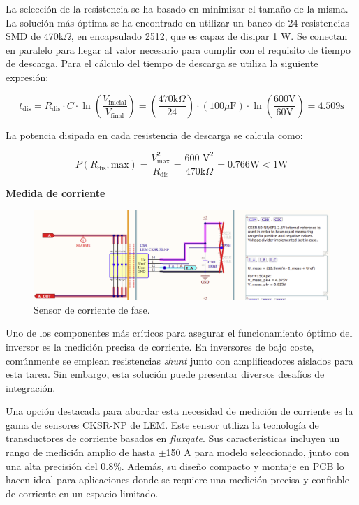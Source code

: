 La selección de la resistencia se ha basado en minimizar el tamaño de la misma. La solución más óptima se ha encontrado en utilizar un banco de 24 resistencias SMD de 470k$\Omega$, en encapsulado 2512, que es capaz de disipar 1 W. Se conectan en paralelo para llegar al valor necesario para cumplir con el requisito de tiempo de descarga. Para el cálculo del tiempo de descarga se utiliza la siguiente expresión:

\[
t_{\text{dis}} = R_{\text{dis}} \cdot C \cdot \ln\left(\frac{V_{\text{inicial}}}{V_{\text{final}}}\right) = \left(\frac{470 \text{k}\Omega}{24}\right) \cdot (100 \mu\text{F}) \cdot \ln\left(\frac{600 \text{V}}{60 \text{V}}\right) = 4.509 \text{s}
\]

La potencia disipada en cada resistencia de descarga se calcula como:

\[
P(R_{\text{dis}}, \text{max}) = \frac{V_{\text{max}}^2}{R_{\text{dis}}} = \frac{600\text{ V}^2}{470 \text{k}\Omega} = 0.766 \text{W} < 1 \text{W}
\]

\textbf{Medida de corriente}

\begin{figure}[H]
	\centering
	\includegraphics[width=0.8\linewidth]{fig/Imeas-sch}
	\caption{Sensor de corriente de fase.}
\end{figure}

Uno de los componentes más críticos para asegurar el funcionamiento óptimo del inversor es la medición precisa de corriente. En inversores de bajo coste, comúnmente se emplean resistencias \textit{shunt} junto con amplificadores aislados para esta tarea. Sin embargo, esta solución puede presentar diversos desafíos de integración.

Una opción destacada para abordar esta necesidad de medición de corriente es la gama de sensores CKSR-NP de LEM. Este sensor utiliza la tecnología de transductores de corriente basados en \textit{fluxgate}. Sus características incluyen un rango de medición amplio de hasta $\pm$150 A para modelo seleccionado, junto con una alta precisión del 0.8\%. Además, su diseño compacto y montaje en PCB lo hacen ideal para aplicaciones donde se requiere una medición precisa y confiable de corriente en un espacio limitado.

